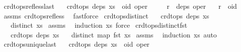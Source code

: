 \begin{isabellebody}
{\isafoldproof}%
%
\isadelimproof
\isanewline
%
\endisadelimproof
\isanewline
{}\isamarkupfalse%
\ crdt{\isacharunderscore}ops{\isacharunderscore}ref{\isacharunderscore}less{\isacharunderscore}last{\isacharcolon}\isanewline
\ \ \ {\isachardoublequoteopen}crdt{\isacharunderscore}ops\ deps\ {\isacharparenleft}xs\ {\isacharat}\ {\isacharbrackleft}{\isacharparenleft}oid{\isacharcomma}\ oper{\isacharparenright}{\isacharbrackright}{\isacharparenright}{\isachardoublequoteclose}\isanewline
\ \ \ \ \ {\isachardoublequoteopen}r\ {\isasymin}\ deps\ oper{\isachardoublequoteclose}\isanewline
\ \ \ {\isachardoublequoteopen}r\ {\isacharless}\ oid{\isachardoublequoteclose}\isanewline
%
\isadelimproof
%
\endisadelimproof
%
\isatagproof
{}\isamarkupfalse%
\ assms\ crdt{\isacharunderscore}ops{\isacharunderscore}ref{\isacharunderscore}less\ \isamarkupfalse%
\ fastforce%
\endisatagproof
{\isafoldproof}%
%
\isadelimproof
\isanewline
%
\endisadelimproof
\isanewline
{}\isamarkupfalse%
\ crdt{\isacharunderscore}ops{\isacharunderscore}distinct{\isacharcolon}\isanewline
\ \ \ {\isachardoublequoteopen}crdt{\isacharunderscore}ops\ deps\ xs{\isachardoublequoteclose}\isanewline
\ \ \ {\isachardoublequoteopen}distinct\ xs{\isachardoublequoteclose}\isanewline
%
\isadelimproof
%
\endisadelimproof
%
\isatagproof
{}\isamarkupfalse%
\ assms\ \isamarkupfalse%
\ {\isacharparenleft}induction\ xs{\isacharcomma}\ force{\isacharplus}{\isacharparenright}%
\endisatagproof
{\isafoldproof}%
%
\isadelimproof
\isanewline
%
\endisadelimproof
\isanewline
{}\isamarkupfalse%
\ crdt{\isacharunderscore}ops{\isacharunderscore}distinct{\isacharunderscore}fst{\isacharcolon}\isanewline
\ \ \ {\isachardoublequoteopen}crdt{\isacharunderscore}ops\ deps\ xs{\isachardoublequoteclose}\isanewline
\ \ \ {\isachardoublequoteopen}distinct\ {\isacharparenleft}map\ fst\ xs{\isacharparenright}{\isachardoublequoteclose}\isanewline
%
\isadelimproof
%
\endisadelimproof
%
\isatagproof
{}\isamarkupfalse%
\ assms\ \isamarkupfalse%
\ {\isacharparenleft}induction\ xs{\isacharcomma}\ auto{\isacharparenright}%
\endisatagproof
{\isafoldproof}%
%
\isadelimproof
\isanewline
%
\endisadelimproof
\isanewline
{}\isamarkupfalse%
\ crdt{\isacharunderscore}ops{\isacharunderscore}unique{\isacharunderscore}last{\isacharcolon}\isanewline
\ \ \ {\isachardoublequoteopen}crdt{\isacharunderscore}ops\ deps\ {\isacharparenleft}xs\ {\isacharat}\ {\isacharbrackleft}{\isacharparenleft}oid{\isacharcomma}\ oper{\isacharparenright}{\isacharbrackright}{\isacharparenright}{\isachardoublequoteclose}\isanewline

\end{isabellebody}
